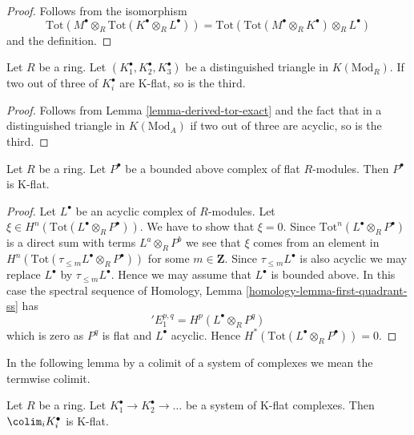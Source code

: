 \begin{proof}
Follows from the isomorphism
$$
\text{Tot}(M^\bullet \otimes_R \text{Tot}(K^\bullet \otimes_R L^\bullet))
=
\text{Tot}(\text{Tot}(M^\bullet \otimes_R K^\bullet) \otimes_R L^\bullet)
$$
and the definition.
\end{proof}

\begin{lemma}
\label{lemma-K-flat-two-out-of-three}
Let $R$ be a ring. Let $(K_1^\bullet, K_2^\bullet, K_3^\bullet)$ be
a distinguished triangle in $K(\text{Mod}_R)$. If two out of three
of $K_i^\bullet$ are K-flat, so is the third.
\end{lemma}

\begin{proof}
Follows from
Lemma \ref{lemma-derived-tor-exact}
and the fact that in a distinguished triangle in
$K(\text{Mod}_A)$ if two out of three are acyclic, so is the third.
\end{proof}

\begin{lemma}
\label{lemma-derived-tor-quasi-isomorphism}
Let $R$ be a ring. Let $P^\bullet$ be a bounded above complex of
flat $R$-modules. Then $P^\bullet$ is K-flat.
\end{lemma}

\begin{proof}
Let $L^\bullet$ be an acyclic complex of $R$-modules.
Let $\xi \in H^n(\text{Tot}(L^\bullet \otimes_R P^\bullet))$.
We have to show that $\xi = 0$.
Since $\text{Tot}^n(L^\bullet \otimes_R P^\bullet)$ is a direct
sum with terms $L^a \otimes_R P^b$ we see that $\xi$ comes from
an element in $H^n(\text{Tot}(\tau_{\leq m}L^\bullet \otimes_R P^\bullet))$
for some $m \in \mathbf{Z}$. Since $\tau_{\leq m}L^\bullet$ is also
acyclic we may replace $L^\bullet$ by $\tau_{\leq m}L^\bullet$.
Hence we may assume that $L^\bullet$ is bounded above.
In this case the spectral sequence of
Homology, Lemma \ref{homology-lemma-first-quadrant-ss}
has
$$
{}'E_1^{p, q} = H^p(L^\bullet \otimes_R P^q)
$$
which is zero as $P^q$ is flat and $L^\bullet$ acyclic. Hence
$H^*(\text{Tot}(L^\bullet \otimes_R P^\bullet)) = 0$.
\end{proof}

\noindent
In the following lemma by a colimit of a system of complexes we mean
the termwise colimit.

\begin{lemma}
\label{lemma-colimit-K-flat}
Let $R$ be a ring.
Let $K_1^\bullet \to K_2^\bullet \to \ldots$
be a system of K-flat complexes.
Then $\colim_i K_i^\bullet$ is K-flat.
\end{lemma}

